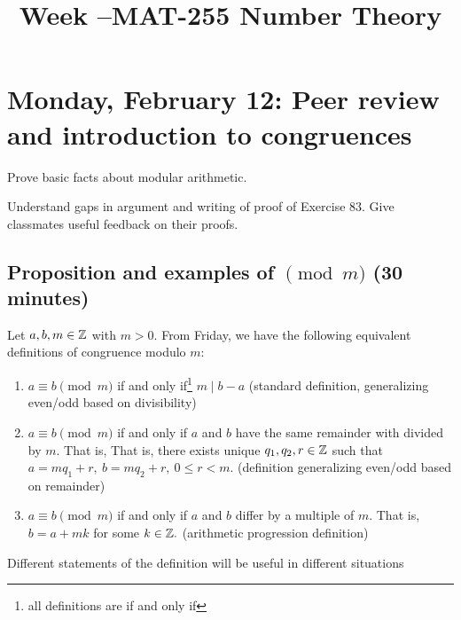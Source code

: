 \documentclass[letterpaper, 11 pt]{ximera}
\title{Week \week--MAT-255 Number Theory}
\begin{document}
\section{Monday, February 12: Peer review and introduction to congruences}

\begin{obj}
\item Prove basic facts about modular arithmetic.
 \item Understand gaps in argument and writing of proof of Exercise 83. Give classmates useful feedback on their proofs.
\end{obj}
\subsection{Proposition and examples of $\pmod m$ (30 minutes)}

\begin{defn}\label{defn:mod-equiv-all}
Let $a,b,m\in\mathbb Z$ with $m>0.$ From Friday, we have the following equivalent definitions of congruence modulo $m:$
\begin{enumerate}
 \item $a\equiv b \pmod m$ if and only if\footnote{all definitions are if and only if} $m\mid b-a$ (standard definition, generalizing even/odd based on divisibility)
 \item $a\equiv b \pmod m$ if and only if $a$ and $b$ have the same remainder with divided by $m.$ That is, That is, there exists unique $q_1,q_2,r\in\mathbb Z$ such that  $a=mq_1+r,\   b=mq_2+r,\  0\leq r<m.$ (definition generalizing even/odd based on remainder)
\item $a\equiv b\pmod m$ if and only if $a$ and $b$ differ by a multiple of $m.$ That is, $b=a+mk$ for some $k\in\mathbb Z.$ (arithmetic progression definition)
\end{enumerate}
\end{defn}

Different statements of the definition will be useful in different situations
\end{document}

